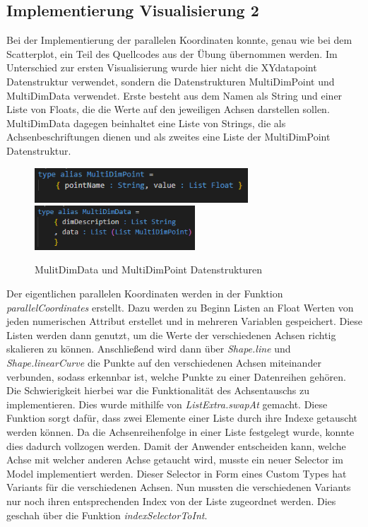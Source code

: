\documentclass[usegeometry=true]{scrartcl}
\begin{document}
\subsection{Implementierung Visualisierung 2}
Bei der Implementierung der parallelen Koordinaten konnte, genau wie bei dem Scatterplot, ein Teil des Quellcodes aus der Übung übernommen werden. Im Unterschied zur ersten
Visualisierung wurde hier nicht die XYdatapoint Datenstruktur verwendet, sondern die Datenstrukturen MultiDimPoint und MultiDimData verwendet. Erste besteht aus dem Namen als
String und einer Liste von Floats, die die Werte auf den jeweiligen Achsen darstellen sollen. MultiDimData dagegen beinhaltet eine Liste von Strings, die als Achsenbeschriftungen
dienen und als zweites eine Liste der MultiDimPoint Datenstruktur.
\begin{figure} [H]
	\begin{center}
		\includegraphics[width=8cm]{IMG/MultiDimPoint.png}
		\includegraphics[width=6cm]{IMG/MulitDimData.png}
		\caption{MulitDimData und MultiDimPoint Datenstrukturen}
		\label{fig:Datenstrukturen_ParCoord}
	\end{center}
\end{figure}

\noindent Der eigentlichen parallelen Koordinaten werden in der Funktion \textit{parallelCoordinates} erstellt. Dazu werden zu Beginn Listen an Float Werten von jeden
numerischen Attribut erstellet und in mehreren Variablen gespeichert. Diese Listen werden dann genutzt, um die Werte der verschiedenen Achsen richtig skalieren zu können.
Anschließend wird dann über \textit{Shape.line} und \textit{Shape.linearCurve} die Punkte auf den verschiedenen Achsen miteinander verbunden, sodass erkennbar ist, welche Punkte
zu einer Datenreihen gehören. \\

\noindent Die Schwierigkeit hierbei war die Funktionalität des Achsentauschs zu implementieren. Dies wurde mithilfe von \textit{ListExtra.swapAt} gemacht. Diese Funktion sorgt dafür,
dass zwei Elemente einer Liste durch ihre Indexe getauscht werden können. Da die Achsenreihenfolge in einer Liste festgelegt wurde, konnte dies dadurch vollzogen werden. Damit
der Anwender entscheiden kann, welche Achse mit welcher anderen Achse getaucht wird, musste ein neuer Selector im Model implementiert werden. Dieser Selector in Form
eines Custom Types hat Variants für die verschiedenen Achsen. Nun mussten die verschiedenen Variants nur noch ihren entsprechenden Index von der Liste zugeordnet werden.
Dies geschah über die Funktion \textit{indexSelectorToInt}.
\end{document}
